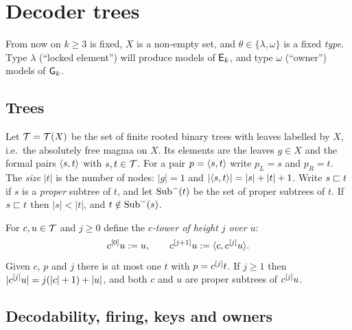 \section{Decoder trees}\label{sec:def}

From now on $k\ge3$ is fixed, $X$ is a non-empty set, and
$\theta\in\{\lambda,\omega\}$ is a fixed \emph{type}. Type $\lambda$
(``locked element'') will produce models of $\mathsf{E}_{k}$, and type $\omega$
(``owner'') models of $\mathsf{G}_{k}$.

\subsection{Trees}
Let $\mathcal{T}=\mathcal{T}(X)$ be the set of finite rooted binary trees with leaves labelled by
$X$, i.e.\ the absolutely free magma on $X$. Its elements are the leaves
$g\in X$ and the formal pairs $\langle s,t\rangle$ with $s,t\in\mathcal{T}$. For a pair
$p=\langle s,t\rangle$ write $p_L=s$ and $p_R=t$. The \emph{size} $|t|$ is the number
of nodes: $|g|=1$ and $|\langle s,t\rangle|=|s|+|t|+1$. Write $s\sqsubset t$ if $s$ is a
\emph{proper} subtree of $t$, and let $\operatorname{Sub}^{-}(t)$ be the set of proper subtrees
of $t$. If $s\sqsubset t$ then $|s|<|t|$, and $t\notin\operatorname{Sub}^{-}(s)$.

For $c,u\in\mathcal{T}$ and $j\ge0$ define the \emph{$c$-tower of height $j$ over $u$}:
\[
  c^{[0]}u:=u,\qquad c^{[j+1]}u:=\langle c,c^{[j]}u\rangle .
\]
Given $c$, $p$ and $j$ there is at most one $t$ with $p=c^{[j]}t$. If
$j\ge1$ then $|c^{[j]}u|=j(|c|+1)+|u|$, and both $c$ and $u$ are proper
subtrees of $c^{[j]}u$.

\subsection{Decodability, firing, keys and owners}

